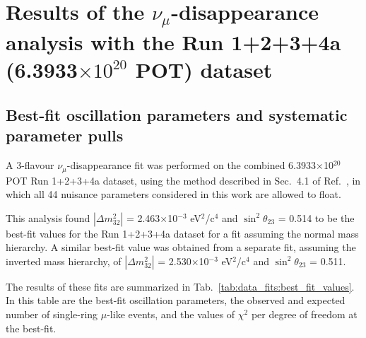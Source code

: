 \clearpage

\section {Results of the $\nu_{\mu}$-disappearance analysis with the Run 1+2+3+4a (6.3933$\times10^{20}$ POT) dataset}
\label{sec:results}


\subsection {Best-fit oscillation parameters and systematic parameter pulls}
\label{sec:results_bestfit}

A 3-flavour $\nu_{\mu}$-disappearance fit was performed on the combined 6.3933$\times$10$^{20}$ 
POT Run 1+2+3+4a dataset, using the method described in Sec.\ 4.1 of Ref.\ \cite{OurRun123DisappAnalysis3Flavour},
in which all 44 nuisance parameters considered in this work are allowed to float. 

This analysis found
$|\Delta m^{2}_{32}|$ = 2.463$\times$10$^{-3}$ eV$^{2}$/c$^{4}$ and
$\sin^{2}\theta_{23}$ = 0.514
to be the best-fit values for the Run 1+2+3+4a dataset
for a fit assuming the normal mass hierarchy.
A similar best-fit value was obtained from a separate fit,
assuming the inverted mass hierarchy, of
$|\Delta m^{2}_{32}|$ = 2.530$\times$10$^{-3}$ eV$^{2}$/c$^{4}$ and
$\sin^{2}\theta_{23}$ = 0.511.

The results of these fits are summarized in Tab.\ \ref{tab:data_fits:best_fit_values}. In this table are 
the best-fit oscillation parameters, the observed and expected number of single-ring $\mu$-like events,
and the values of $\chi^{2}$ per degree of freedom at the best-fit.

